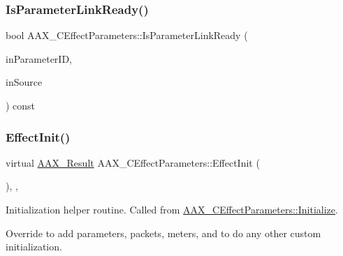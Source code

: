 \mbox{\label{a01481_adf4d2d6060bf3e13619838cea8b59865}} 
\subsubsection{\texorpdfstring{IsParameterLinkReady()}{IsParameterLinkReady()}}
{\footnotesize\ttfamily bool A\+A\+X\+\_\+\+C\+Effect\+Parameters\+::\+Is\+Parameter\+Link\+Ready (\begin{DoxyParamCaption}\item[{\mbox{\hyperlink{a00392_a1440c756fe5cb158b78193b2fc1780d1}{A\+A\+X\+\_\+\+C\+Param\+ID}}}]{in\+Parameter\+ID,  }\item[{\mbox{\hyperlink{a00491_a30be0398faf20c6b121239eb9399f3f7}{A\+A\+X\+\_\+\+E\+Update\+Source}}}]{in\+Source }\end{DoxyParamCaption}) const\hspace{0.3cm}{\ttfamily [protected]}}

\mbox{\label{a01481_a2e302fd758d39a6a855023bf825fe148}} 
\subsubsection{\texorpdfstring{EffectInit()}{EffectInit()}}
{\footnotesize\ttfamily virtual \mbox{\hyperlink{a00392_a4d8f69a697df7f70c3a8e9b8ee130d2f}{A\+A\+X\+\_\+\+Result}} A\+A\+X\+\_\+\+C\+Effect\+Parameters\+::\+Effect\+Init (\begin{DoxyParamCaption}\item[{void}]{ }\end{DoxyParamCaption})\hspace{0.3cm}{\ttfamily [inline]}, {\ttfamily [protected]}, {\ttfamily [virtual]}}



Initialization helper routine. Called from \mbox{\hyperlink{a01481_a245f235300b04f1c8b4c83831d296e22}{A\+A\+X\+\_\+\+C\+Effect\+Parameters\+::\+Initialize}}. 

Override to add parameters, packets, meters, and to do any other custom initialization.

